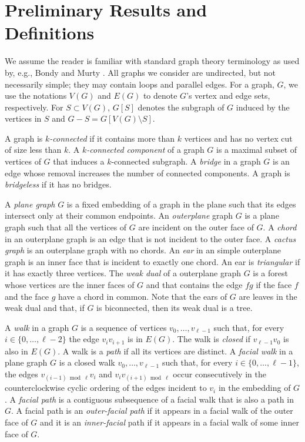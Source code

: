 \documentclass{cccg16}
\begin{document}
\section{Preliminary Results and Definitions}

We assume the reader is familiar with standard graph theory terminology
as used by, e.g., Bondy and Murty \cite{bondy.murty:graph}.  All graphs
we consider are undirected, but not necessarily simple; they may contain
loops and parallel edges.  For a graph, $G$, we use the notations $V(G)$
and $E(G)$ to denote $G$'s vertex and edge sets, respectively. For
$S\subset V(G)$, $G[S]$ denotes the subgraph of $G$ induced by the
vertices in $S$ and $G-S=G[V(G)\setminus S]$.

A graph is \emph{$k$-connected} if it contains more than $k$ vertices
and has no vertex cut of size less than $k$.  A \emph{$k$-connected
component} of a graph $G$ is a maximal subset of vertices of $G$ that
induces a $k$-connected subgraph.  A \emph{bridge} in a graph $G$ is an
edge whose removal increases the number of connected components.
A graph is \emph{bridgeless} if it has no bridges.

A \emph{plane graph} $G$ is a fixed embedding of a graph in the plane
such that its edges intersect only at their common endpoints. An
\emph{outerplane} graph $G$ is a plane graph such that all the
vertices of $G$ are incident on the outer face of $G$. A \emph{chord}
in an outerplane graph is an edge that is not incident to the outer
face. A \emph{cactus graph} is an outerplane graph with no chords.
An \emph{ear} in an simple outerplane graph is an inner face that is
incident to exactly one chord. An ear is \emph{triangular} if it has
exactly three vertices.  The \emph{weak dual} of a outerplane graph $G$
is a forest whose vertices are the inner faces of $G$ and that contains
the edge $fg$ if the face $f$ and the face $g$ have a chord in common.
Note that the ears of $G$ are leaves in the weak dual and that, if $G$
is biconnected, then its weak dual is a tree.

A \emph{walk} in a graph $G$ is a sequence of vertices
$v_0,\ldots,v_{\ell-1}$ such that, for every $i\in\{0,\ldots,\ell-2\}$
the edge $v_iv_{i+1}$ is in $E(G)$.  The walk is \emph{closed} if
$v_{\ell-1}v_0$ is also in $E(G)$.  A walk is a \emph{path} if all
its vertices are distinct.  A \emph{facial walk} in a plane graph
$G$ is a closed walk $v_0,\ldots,v_{\ell-1}$ such that, for every
$i\in\{0,\ldots,\ell-1\}$, the edges $v_{(i-1)\bmod \ell} v_i$ and
$v_iv_{(i+1)\bmod\ell}$ occur consecutively in the counterclockwise
cyclic ordering of the edges incident to $v_i$ in the embedding of $G$.
A \emph{facial path} is a contiguous subsequence of a facial walk that
is also a path in $G$.  A facial path is an \emph{outer-facial path}
if it appears in a facial walk of the outer face of $G$ and it is an
\emph{inner-facial} path if it appears in a facial walk of some inner
face of $G$.
\end{document}

